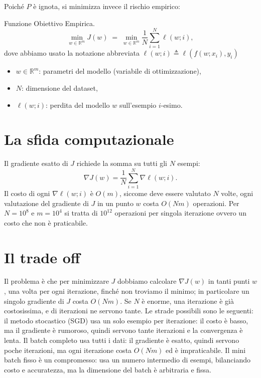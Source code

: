 \documentclass[italian, a4paper, twoside, binding=6mm]{sapthesis}
\newcommand{\R}{\mathbb{R}}
\begin{document}
Poich\'e $P$ \`e ignota, si minimizza invece il rischio empirico:

\begin{definitionbox}
  Funzione Obiettivo Empirica.
  \begin{equation}\label{eq:empirical_risk}
    \min_{w \in \R^m} J(w) \;=\; \min_{w \in \R^m}\frac{1}{N} \sum_{i=1}^{N} \ell(w; i),
  \end{equation}
  dove abbiamo usato la notazione abbreviata $\ell(w;i) \triangleq \ell(f(w;x_i), y_i)$
  \begin{itemize}
    \item $w \in \R^m$: parametri del modello (variabile di ottimizzazione),
    \item $N$: dimensione del dataset,
    \item $\ell(w;i)$: perdita del modello $w$ sull'esempio $i$-esimo.
  \end{itemize}
\end{definitionbox}

\section{La sfida computazionale}

Il gradiente esatto di $J$ richiede la somma su tutti gli $N$ esempi:
\[
  \nabla J(w) = \frac{1}{N}\sum_{i=1}^N \nabla \ell(w;i).
\]
Il costo di ogni $\nabla \ell(w;i)$ \`e $O(m)$, siccome deve essere valutato $N$ volte, ogni valutazione del gradiente di $J $ in un punto $ w $ costa $O(Nm)$ operazioni. Per $N=10^8$ e $m=10^4$ si tratta di $10^{12}$ operazioni per singola iterazione ovvero un costo che non è praticabile.

\section{Il trade off}

Il problema è che per minimizzare \(J\) dobbiamo calcolare \(\nabla J(w)\) in tanti punti \(w\), una volta per ogni iterazione, finché non troviamo il minimo; in particolare un singolo gradiente di \(J\) costa \(O(Nm)\). Se \(N\) è enorme, una iterazione è già costosissima, e di iterazioni ne servono tante. Le strade possibili sono le seguenti: il metodo stocastico (SGD) usa un solo esempio per iterazione: il costo è basso, ma il gradiente è rumoroso, quindi servono tante iterazioni e la convergenza è lenta.
Il batch completo usa tutti i dati: il gradiente è esatto, quindi servono poche iterazioni, ma ogni iterazione costa \(O(Nm)\) ed è impraticabile.
Il mini batch fisso è un compromesso: usa un numero intermedio di esempi, bilanciando costo e accuratezza, ma la dimensione del batch è arbitraria e fissa.
\end{document}
